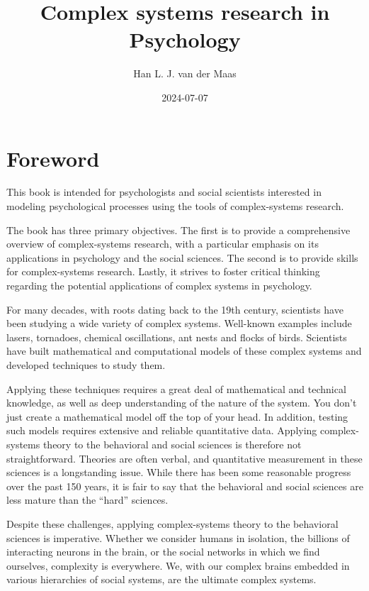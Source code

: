 \documentclass[
  a4paper,
  DIV=11,
  numbers=noendperiod,
  oneside]{scrreprt}
\title{Complex systems research in Psychology}
\author{Han L. J. van der Maas}
\date{2024-07-07}
\renewcommand*\contentsname{Table of contents}
\newcommand\contentsname{Table of contents}
\begin{document}
\maketitle

\renewcommand*\contentsname{Table of contents}
{
\hypersetup{linkcolor=}
\setcounter{tocdepth}{7}
\tableofcontents
}

\chapter*{Foreword}\label{foreword}


This book is intended for psychologists and social scientists interested
in modeling psychological processes using the tools of complex-systems
research.

The book has three primary objectives. The first is to provide a
comprehensive overview of complex-systems research, with a particular
emphasis on its applications in psychology and the social sciences. The
second is to provide skills for complex-systems research. Lastly, it
strives to foster critical thinking regarding the potential applications
of complex systems in psychology.

For many decades, with roots dating back to the 19th century, scientists
have been studying a wide variety of complex systems. Well-known
examples include lasers, tornadoes, chemical oscillations, ant nests and
flocks of birds. Scientists have built mathematical and computational
models of these complex systems and developed techniques to study them.

Applying these techniques requires a great deal of mathematical and
technical knowledge, as well as deep understanding of the nature of the
system. You don't just create a mathematical model off the top of your
head. In addition, testing such models requires extensive and reliable
quantitative data. Applying complex-systems theory to the behavioral and
social sciences is therefore not straightforward. Theories are often
verbal, and quantitative measurement in these sciences is a longstanding
issue. While there has been some reasonable progress over the past 150
years, it is fair to say that the behavioral and social sciences are
less mature than the ``hard'' sciences.

Despite these challenges, applying complex-systems theory to the
behavioral sciences is imperative. Whether we consider humans in
isolation, the billions of interacting neurons in the brain, or the
social networks in which we find ourselves, complexity is everywhere.
We, with our complex brains embedded in various hierarchies of social
systems, are the ultimate complex systems.
\end{document}

